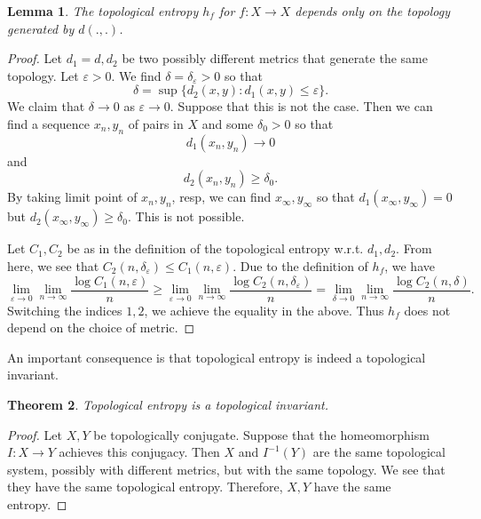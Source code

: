 \documentclass[12pt]{article}
\newtheorem{theorem}{Theorem}[section]
\newtheorem{lemma}[theorem]{Lemma}
\theoremstyle{definition}
\theoremstyle{remark}
\begin{document}
\begin{lemma}
    The topological entropy $h_f$ for $f:X\to X$ depends only on the topology generated by $d(.,.)$.
\end{lemma}
\begin{proof}
    Let $d_1=d,d_2$ be two possibly different metrics that generate the same topology. Let $\varepsilon>0$. We find $\delta=\delta_\varepsilon>0$ so that
    \[
    \delta=\sup\{d_2(x,y):d_1(x,y)\leq \varepsilon\}.
    \]
    We claim that $\delta\to 0$ as $\varepsilon\to 0.$ Suppose that this is not the case. Then we can find a sequence $x_n,y_n$ of pairs in $X$ and some $\delta_0>0$ so that
    \[
    d_1(x_n,y_n)\to 0
    \]
    and
    \[
    d_2(x_n,y_n)\geq \delta_0.
    \]
    By taking limit point of $x_n,y_n$, resp, we can find $x_\infty,y_\infty$ so that $d_1(x_\infty,y_\infty)=0$ but $d_2(x_\infty,y_\infty)\geq \delta_0$. This is not possible.

    Let $C_1,C_2$ be as in the definition of the topological entropy w.r.t. $d_1,d_2$. From here, we see that $C_2(n,\delta_\varepsilon)\leq C_1(n,\varepsilon).$ Due to the definition of $h_f$, we have
    \[
    \lim_{\varepsilon\to 0}\lim_{n\to\infty} \frac{\log C_1(n,\varepsilon)}{n}\geq \lim_{\varepsilon\to 0}\lim_{n\to\infty} \frac{\log C_2(n,\delta_\varepsilon)}{n}=\lim_{\delta\to 0}\lim_{n\to\infty} \frac{\log C_2(n,\delta)}{n}.
    \]
    Switching the indices $1,2$, we achieve the equality in the above. Thus $h_f$ does not depend on the choice of metric.
\end{proof}
An important consequence is that topological entropy is indeed a topological invariant.
\begin{theorem}
    Topological entropy is a topological invariant.
\end{theorem}
\begin{proof}
    Let $X,Y$ be topologically conjugate. Suppose that the homeomorphism $I:X\to Y$ achieves this conjugacy. Then $X$ and $I^{-1}(Y)$ are the same topological system, possibly with different metrics, but with the same topology. We see that they have the same topological entropy. Therefore, $X,Y$ have the same entropy.
\end{proof}
\end{document}
